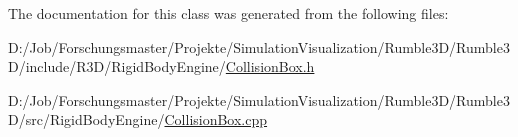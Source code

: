 The documentation for this class was generated from the following files\+:\begin{DoxyCompactItemize}
\item 
D\+:/\+Job/\+Forschungsmaster/\+Projekte/\+Simulation\+Visualization/\+Rumble3\+D/\+Rumble3\+D/include/\+R3\+D/\+Rigid\+Body\+Engine/\mbox{\hyperlink{_collision_box_8h}{Collision\+Box.\+h}}\item 
D\+:/\+Job/\+Forschungsmaster/\+Projekte/\+Simulation\+Visualization/\+Rumble3\+D/\+Rumble3\+D/src/\+Rigid\+Body\+Engine/\mbox{\hyperlink{_collision_box_8cpp}{Collision\+Box.\+cpp}}\end{DoxyCompactItemize}
